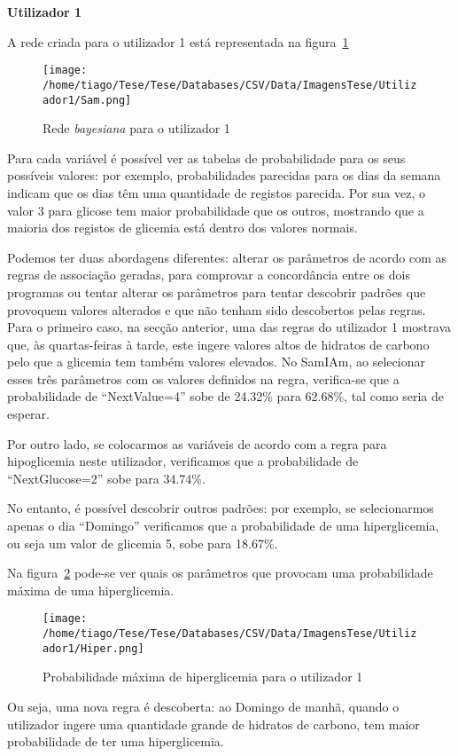 \textbf{Utilizador 1}

A rede criada para o utilizador 1 está representada na figura~\ref{fig:sam1}

\begin{figure}[H]
\centering
\texttt{[image: /home/tiago/Tese/Tese/Databases/CSV/Data/ImagensTese/Utilizador1/Sam.png]}
\caption{Rede \textit{bayesiana} para o utilizador 1}
\label{fig:sam1}
\end{figure}
Para cada variável é possível ver as tabelas de probabilidade para os seus possíveis valores: por exemplo, probabilidades parecidas para os dias da semana indicam que os dias têm uma quantidade de registos parecida. Por sua vez, o valor 3 para glicose tem maior probabilidade que os outros, mostrando que a maioria dos registos de glicemia está dentro dos valores normais.

Podemos ter duas abordagens diferentes: alterar os parâmetros de acordo com as regras de associação geradas, para comprovar a concordância entre os dois programas ou tentar alterar os parâmetros para tentar descobrir padrões que provoquem valores alterados e que não tenham sido descobertos pelas regras. 
Para o primeiro caso, na secção anterior, uma das regras do utilizador 1 mostrava que, às quartas-feiras à tarde, este ingere valores altos de hidratos de carbono pelo que a glicemia tem também valores elevados. No SamIAm, ao selecionar esses três parâmetros com os valores definidos na regra, verifica-se que a probabilidade de ``Next\textunderscore Value=4'' sobe de 24.32\% para 62.68\%, tal como seria de esperar.

Por outro lado, se colocarmos as variáveis de acordo com a regra para hipoglicemia neste utilizador, verificamos que a probabilidade de ``Next\textunderscore Glucose=2'' sobe para 34.74\%.

No entanto, é possível descobrir outros padrões: por exemplo, se selecionarmos apenas o dia ``Domingo'' verificamos que a probabilidade de uma hiperglicemia, ou seja um valor de glicemia 5, sobe para 18.67\%. 

Na figura~\ref{fig:hiper1} pode-se ver quais os parâmetros que provocam uma probabilidade máxima de uma hiperglicemia.

\begin{figure}[H]
\centering
\texttt{[image: /home/tiago/Tese/Tese/Databases/CSV/Data/ImagensTese/Utilizador1/Hiper.png]}
\caption{Probabilidade máxima de hiperglicemia para o utilizador 1}
\label{fig:hiper1}
\end{figure}
Ou seja, uma nova regra é descoberta: ao Domingo de manhã, quando o utilizador ingere uma quantidade grande de hidratos de carbono, tem maior probabilidade de ter uma hiperglicemia. 

